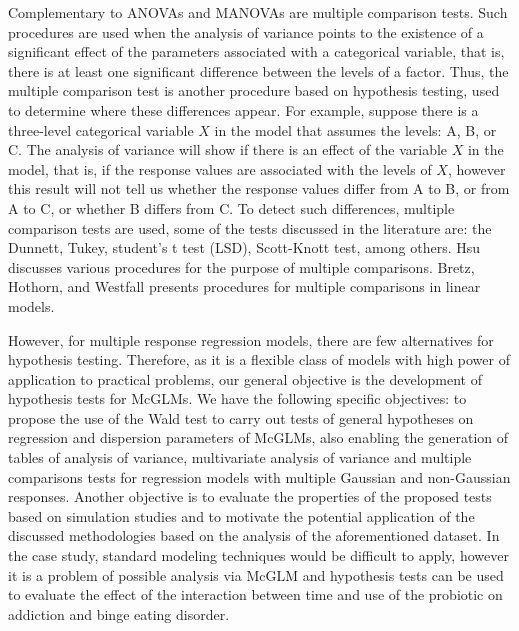\documentclass[AMA,STIX1COL]{WileyNJD-v2}
\begin{document}
Complementary to ANOVAs and MANOVAs are multiple comparison tests. Such procedures are used when the analysis of variance points to the existence of a significant effect of the parameters associated with a categorical variable, that is, there is at least one significant difference between the levels of a factor. Thus, the multiple comparison test is another procedure based on hypothesis testing, used to determine where these differences appear. For example, suppose there is a three-level categorical variable $X$ in the model that assumes the levels: A, B, or C. The analysis of variance will show if there is an effect of the variable $X$ in the model, that is, if the response values are associated with the levels of $X$, however this result will not tell us whether the response values differ from A to B, or from A to C, or whether B differs from C. To detect such differences, multiple comparison tests are used, some of the tests discussed in the literature are: the Dunnett, Tukey, student's t test (LSD), Scott-Knott test, among others. Hsu \cite{hsu1996multiple} discusses various procedures for the purpose of multiple comparisons. Bretz, Hothorn, and Westfall \cite{bretz2008multiple} presents procedures for multiple comparisons in linear models.


However, for multiple response regression models, there are few alternatives for hypothesis testing. Therefore, as it is a flexible class of models with high power of application to practical problems, our general objective is the development of hypothesis tests for McGLMs. We have the following specific objectives: to propose the use of the Wald test to carry out tests of general hypotheses on regression and dispersion parameters of McGLMs, also enabling the generation of tables of analysis of variance, multivariate analysis of variance and multiple comparisons tests for regression models with multiple Gaussian and non-Gaussian responses. Another objective is to evaluate the properties of the proposed tests based on simulation studies and to motivate the potential application of the discussed methodologies based on the analysis of the aforementioned dataset. In the case study, standard modeling techniques would be difficult to apply, however it is a problem of possible analysis via McGLM and hypothesis tests can be used to evaluate the effect of the interaction between time and use of the probiotic on addiction and binge eating disorder.

\end{document}
